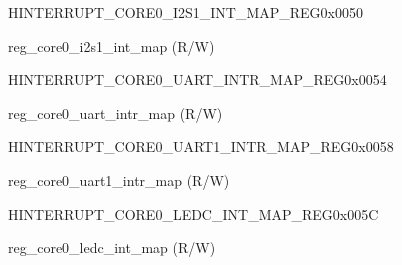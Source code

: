 \begin{register}{H}{INTERRUPT\_CORE0\_I2S1\_INT\_MAP\_REG}{0x0050}\label{regdesc:INTERRUPTCORE0I2S1INTMAPREG}
%
%
\regnewline%
\begin{regdesc}\begin{reglist}
\label{fielddesc:INTERRUPTCORE0I2S1INTMAP}\item [INTERRUPT\_CORE0\_I2S1\_INT\_MAP] reg\_core0\_i2s1\_int\_map (R/W)
\end{reglist}\end{regdesc}
\end{register}


\begin{register}{H}{INTERRUPT\_CORE0\_UART\_INTR\_MAP\_REG}{0x0054}\label{regdesc:INTERRUPTCORE0UARTINTRMAPREG}
%
%
\regnewline%
\begin{regdesc}\begin{reglist}
\label{fielddesc:INTERRUPTCORE0UARTINTRMAP}\item [INTERRUPT\_CORE0\_UART\_INTR\_MAP] reg\_core0\_uart\_intr\_map (R/W)
\end{reglist}\end{regdesc}
\end{register}


\begin{register}{H}{INTERRUPT\_CORE0\_UART1\_INTR\_MAP\_REG}{0x0058}\label{regdesc:INTERRUPTCORE0UART1INTRMAPREG}
%
%
\regnewline%
\begin{regdesc}\begin{reglist}
\label{fielddesc:INTERRUPTCORE0UART1INTRMAP}\item [INTERRUPT\_CORE0\_UART1\_INTR\_MAP] reg\_core0\_uart1\_intr\_map (R/W)
\end{reglist}\end{regdesc}
\end{register}


\begin{register}{H}{INTERRUPT\_CORE0\_LEDC\_INT\_MAP\_REG}{0x005C}\label{regdesc:INTERRUPTCORE0LEDCINTMAPREG}
%
%
\regnewline%
\begin{regdesc}\begin{reglist}
\label{fielddesc:INTERRUPTCORE0LEDCINTMAP}\item [INTERRUPT\_CORE0\_LEDC\_INT\_MAP] reg\_core0\_ledc\_int\_map (R/W)
\end{reglist}\end{regdesc}
\end{register}


